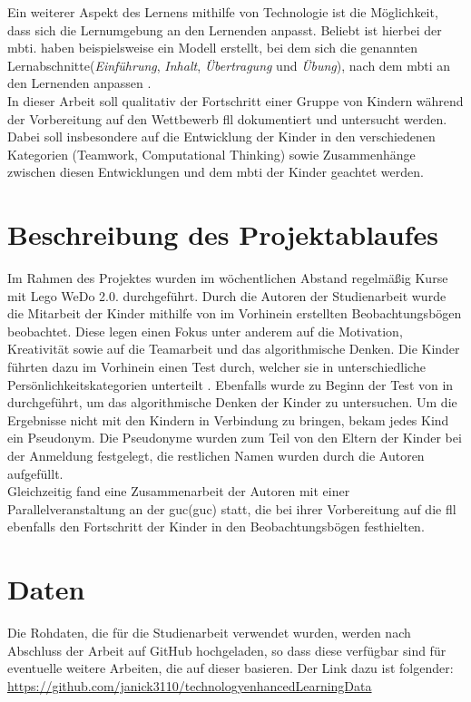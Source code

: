 Ein weiterer Aspekt des Lernens mithilfe von Technologie ist die Möglichkeit, dass sich die Lernumgebung an den Lernenden anpasst. Beliebt ist hierbei der \acrlong{mbti}. \citeauthor{yel_adaptive_2018} haben beispielsweise ein Modell erstellt, bei dem sich die genannten Lernabschnitte(\textit{Einführung}, \textit{Inhalt}, \textit{Übertragung} und \textit{Übung}), nach dem \acrshort{mbti} an den Lernenden anpassen \cite{yel_adaptive_2018}.\\
In dieser Arbeit soll qualitativ der Fortschritt einer Gruppe von Kindern während der Vorbereitung auf den Wettbewerb \acrlong{fll} dokumentiert und untersucht werden. Dabei soll insbesondere auf die Entwicklung der Kinder in den verschiedenen Kategorien (Teamwork, Computational Thinking) sowie Zusammenhänge zwischen diesen Entwicklungen und dem \acrshort{mbti} der Kinder geachtet werden.



\section{Beschreibung des Projektablaufes}
Im Rahmen des Projektes wurden im wöchentlichen Abstand regelmäßig Kurse mit Lego WeDo 2.0. durchgeführt. Durch die Autoren der Studienarbeit wurde die Mitarbeit der Kinder mithilfe von im Vorhinein erstellten Beobachtungsbögen beobachtet. Diese legen einen Fokus unter anderem auf die Motivation, Kreativität sowie auf die Teamarbeit und das algorithmische Denken. Die Kinder führten dazu im Vorhinein einen Test durch, welcher sie in unterschiedliche Persönlichkeitskategorien unterteilt \cite{knowAndLove}. Ebenfalls wurde zu Beginn der Test von \citeauthor{zapata_bctt_2021} in  durchgeführt, um das algorithmische Denken der Kinder zu untersuchen.
Um die Ergebnisse nicht mit den Kindern in Verbindung zu bringen, bekam jedes Kind ein Pseudonym. Die Pseudonyme wurden zum Teil von den Eltern der Kinder bei der Anmeldung festgelegt, die restlichen Namen wurden durch die Autoren aufgefüllt.\\
Gleichzeitig fand eine Zusammenarbeit der Autoren mit einer Parallelveranstaltung an der \acrlong{guc}(\acrshort{guc}) statt, die bei ihrer Vorbereitung auf die \acrshort{fll} ebenfalls den Fortschritt der Kinder in den Beobachtungsbögen festhielten.


\section{Daten}
Die Rohdaten, die für die Studienarbeit verwendet wurden, werden nach Abschluss der Arbeit auf GitHub hochgeladen, so dass diese verfügbar sind für eventuelle weitere Arbeiten, die auf dieser basieren. Der Link dazu ist folgender: \url{https://github.com/janick3110/technologyenhancedLearningData}